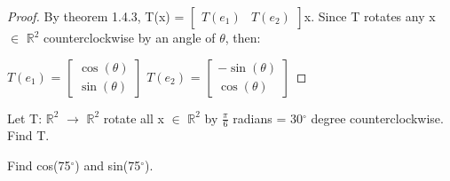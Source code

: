     \begin{proof}
        By {\color{red} theorem 1.4.3},
        T(x) =
        $\begin{bmatrix}
            T(e_1) & T(e_2)
        \end{bmatrix}$x.
        Since T rotates any x $\in$ $\mathbb{R}^2$ counterclockwise
        by an angle of $\theta$, then:

        \hspace{0.5cm}
        $T(e_1)$ =
        $\begin{bmatrix}
            \cos(\theta) \\
            \sin(\theta)
        \end{bmatrix}$
        \hspace{1cm}
        $T(e_2)$ =
        $\begin{bmatrix}
            -\sin(\theta) \\
            \cos(\theta)
        \end{bmatrix}$
    \end{proof}

    \vspace{0.5cm}



    \begin{example}
        Let T: $\mathbb{R}^2$ $\rightarrow$ $\mathbb{R}^2$
        rotate all x $\in$ $\mathbb{R}^2$ by $\frac{\pi}{6}$ radians
        = 30$^{\circ}$ degree
        counterclockwise. Find T.

        Find cos(75$^{\circ}$) and sin(75$^{\circ}$).
    \end{example}

